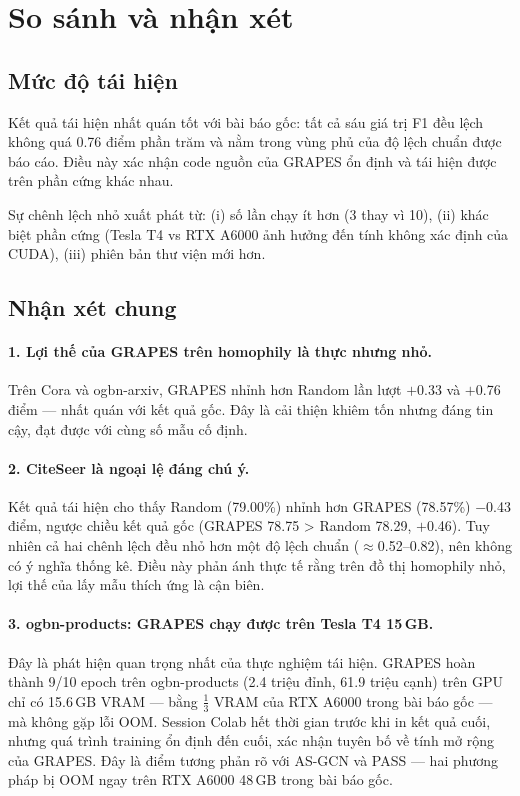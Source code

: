 \section{So sánh và nhận xét}

\subsection{Mức độ tái hiện}

Kết quả tái hiện nhất quán tốt với bài báo gốc: tất cả sáu giá trị F1 đều lệch không quá 0.76 điểm phần trăm và nằm trong vùng phủ của độ lệch chuẩn được báo cáo. Điều này xác nhận code nguồn của GRAPES ổn định và tái hiện được trên phần cứng khác nhau.

Sự chênh lệch nhỏ xuất phát từ: (i) số lần chạy ít hơn (3 thay vì 10), (ii) khác biệt phần cứng (Tesla T4 vs RTX A6000 ảnh hưởng đến tính không xác định của CUDA), (iii) phiên bản thư viện mới hơn.

\subsection{Nhận xét chung}

\paragraph{1. Lợi thế của GRAPES trên homophily là thực nhưng nhỏ.}
Trên Cora và ogbn-arxiv, GRAPES nhỉnh hơn Random lần lượt $+$0.33 và $+$0.76 điểm --- nhất quán với kết quả gốc. Đây là cải thiện khiêm tốn nhưng đáng tin cậy, đạt được với cùng số mẫu cố định.

\paragraph{2. CiteSeer là ngoại lệ đáng chú ý.}
Kết quả tái hiện cho thấy Random (79.00\%) nhỉnh hơn GRAPES (78.57\%) $-$0.43 điểm, ngược chiều kết quả gốc (GRAPES 78.75 > Random 78.29, $+$0.46). Tuy nhiên cả hai chênh lệch đều nhỏ hơn một độ lệch chuẩn ($\approx$0.52--0.82), nên không có ý nghĩa thống kê. Điều này phản ánh thực tế rằng trên đồ thị homophily nhỏ, lợi thế của lấy mẫu thích ứng là cận biên.

\paragraph{3. ogbn-products: GRAPES chạy được trên Tesla T4 15\,GB.}
Đây là phát hiện quan trọng nhất của thực nghiệm tái hiện. GRAPES hoàn thành 9/10 epoch trên ogbn-products (2.4 triệu đỉnh, 61.9 triệu cạnh) trên GPU chỉ có 15.6\,GB VRAM --- bằng $\frac{1}{3}$ VRAM của RTX A6000 trong bài báo gốc --- mà không gặp lỗi OOM. Session Colab hết thời gian trước khi in kết quả cuối, nhưng quá trình training ổn định đến cuối, xác nhận tuyên bố về tính mở rộng của GRAPES. Đây là điểm tương phản rõ với AS-GCN và PASS --- hai phương pháp bị OOM ngay trên RTX A6000 48\,GB trong bài báo gốc.

